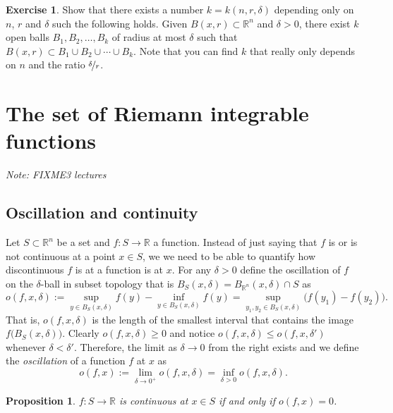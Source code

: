 \documentclass[12pt]{book}
\newcommand{\R}{{\mathbb{R}}}
\newcommand{\myindex}[1]{#1\index{#1}}
\newcommand{\sectionnotes}[1]{\noindent \emph{Note: #1} \medskip \par}
\newcommand{\sectionnewpage}{\clearpage}
\theoremstyle{plain}
\newtheorem{prop}[thm]{Proposition}
\theoremstyle{remark}
\theoremstyle{definition}
\theoremstyle{exercise}
\newtheorem{exercise}{Exercise}[section]
\theoremstyle{example}
\begin{document}
\begin{exercise}
Show that there exists a number $k = k(n,r,\delta)$ depending only on $n$,
$r$ and $\delta$ such
the following holds.
Given $B(x,r) \subset \R^n$ and $\delta > 0$, there exist
$k$ open balls $B_1,B_2,\ldots,B_k$ of radius at most
$\delta$ such that $B(x,r) \subset B_1 \cup B_2 \cup \cdots \cup B_k$.
Note that you can find $k$ that really only depends on $n$ and the ratio
$\nicefrac{\delta}{r}$.
\end{exercise}



\sectionnewpage
\section{The set of Riemann integrable functions }
\label{sec:riemannlebesgue}

\sectionnotes{FIXME3 lectures}

\subsection{Oscillation and continuity}

Let $S \subset \R^n$ be a set and $f \colon S \to \R$ a function.
Instead of just saying that $f$ is or is not continuous at
a point $x \in S$, we
we need to be able to quantify how discontinuous $f$ is at a function is
at $x$.  For any $\delta > 0$ define the oscillation of 
$f$ on the $\delta$-ball in subset topology that is
$B_S(x,\delta) = B_{\R^n}(x,\delta) \cap S$ as
\begin{equation*}
o(f,x,\delta) :=
{\sup_{y \in B_S(x,\delta)} f(y)}
-
{\inf_{y \in B_S(x,\delta)} f(y)}
= 
\sup_{y_1,y_2 \in B_S(x,\delta)} \bigl(f(y_1)-f(y_2)\bigr) .
\end{equation*}
That is, $o(f,x,\delta)$ is the length of the smallest interval
that contains the image $f\bigl(B_S(x,\delta)\bigr)$.
Clearly $o(f,x,\delta) \geq 0$ and
notice $o(f,x,\delta) \leq o(f,x,\delta')$ whenever $\delta < \delta'$.
Therefore, the limit as $\delta \to 0$ from the right exists and
we define the \emph{\myindex{oscillation}} of a function $f$
at $x$ as
\begin{equation*}
o(f,x) :=
\lim_{\delta \to 0^+}
o(f,x,\delta) =
\inf_{\delta > 0}
o(f,x,\delta) .
\end{equation*}

\begin{prop}
$f \colon S \to \R$ is continuous at $x \in S$ if and only if $o(f,x) = 0$.
\end{prop}
\end{document}
